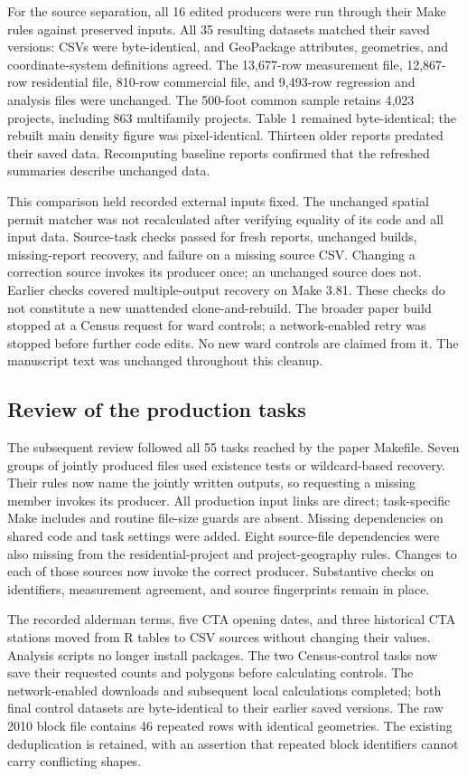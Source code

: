 For the source separation, all 16 edited producers were run through their Make
rules against preserved inputs. All 35 resulting datasets matched their saved
versions: CSVs were byte-identical, and GeoPackage attributes, geometries, and
coordinate-system definitions agreed. The 13,677-row measurement file,
12,867-row residential file, 810-row commercial file, and 9,493-row regression
and analysis files were unchanged. The 500-foot common sample retains 4,023
projects, including 863 multifamily projects. Table 1 remained byte-identical;
the rebuilt main density figure was pixel-identical. Thirteen older reports
predated their saved data. Recomputing baseline reports confirmed that the
refreshed summaries describe unchanged data.

This comparison held recorded external inputs fixed. The unchanged spatial
permit matcher was not recalculated after verifying equality of its code and
all input data. Source-task checks passed for fresh reports, unchanged builds,
missing-report recovery, and failure on a missing source CSV. Changing a
correction source invokes its producer once; an unchanged source does not.
Earlier checks covered multiple-output recovery on Make 3.81. These checks do
not constitute a new unattended clone-and-rebuild. The broader paper build
stopped at a Census request for ward controls; a network-enabled retry was
stopped before further code edits. No new ward controls are claimed from it.
The manuscript text was unchanged throughout this cleanup.

\subsection*{Review of the production tasks}

The subsequent review followed all 55 tasks reached by the paper Makefile.
Seven groups of jointly produced files used existence tests or wildcard-based
recovery. Their rules now name the jointly written outputs, so requesting a
missing member invokes its producer. All production input links are direct;
task-specific Make includes and routine file-size guards are absent. Missing
dependencies on shared code and task settings were added. Eight source-file
dependencies were also missing from the residential-project and project-geography
rules. Changes to each of those sources now invoke the correct producer.
Substantive checks on identifiers, measurement agreement, and source fingerprints
remain in place.

The recorded alderman terms, five CTA opening dates, and three historical CTA
stations moved from R tables to CSV sources without changing their values.
Analysis scripts no longer install packages. The two Census-control tasks now
save their requested counts and polygons before calculating controls. The
network-enabled downloads and subsequent local calculations completed; both
final control datasets are byte-identical to their earlier saved versions.
The raw 2010 block file contains 46 repeated rows with identical geometries.
The existing deduplication is retained, with an assertion that repeated block
identifiers cannot carry conflicting shapes.

